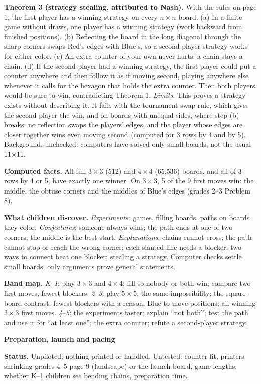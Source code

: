 \documentclass[11pt]{article}
\newcommand{\head}[1]{\par\textbf{\large #1}\par\nopagebreak}
\newcommand{\x}{\ensuremath{\times}}
\begin{document}
\textbf{Theorem 3 (strategy stealing, attributed to Nash).} With the rules on page 1, the first player has a winning strategy on every $n\x n$ board. (a) In a finite game without draws, one player has a winning strategy (work backward from finished positions). (b) Reflecting the board in the long diagonal through the sharp corners swaps Red's edges with Blue's, so a second-player strategy works for either color. (c) An extra counter of your own never hurts: a chain stays a chain. (d) If the second player had a winning strategy, the first player could put a counter anywhere and then follow it as if moving second, playing anywhere else whenever it calls for the hexagon that holds the extra counter. Then both players would be sure to win, contradicting Theorem 1. \emph{Limits.} This proves a strategy exists without describing it. It fails with the tournament swap rule, which gives the second player the win, and on boards with unequal sides, where step (b) breaks: no reflection swaps the players' edges, and the player whose edges are closer together wins even moving second (computed for 3 rows by 4 and by 5). Background, unchecked: computers have solved only small boards, not the usual 11\x11.

\textbf{Computed facts.} All full $3\x3$ (512) and $4\x4$ (65{,}536) boards, and all of 3 rows by 4 or 5, have exactly one winner. On $3\x3$, 5 of the 9 first moves win: the middle, the obtuse corners and the middles of Blue's edges (grades 2--3 Problem 8).

\textbf{What children discover.} \emph{Experiments}: games, filling boards, paths on boards they color. \emph{Conjectures}: someone always wins; the path ends at one of two corners; the middle is the best start. \emph{Explanations}: chains cannot cross; the path cannot stop or reach the wrong corner; each slanted line needs a blocker; two ways to connect beat one blocker; stealing a strategy. Computer checks settle small boards; only arguments prove general statements.

\textbf{Band map.} \emph{K--1}: play $3\x3$ and $4\x4$; fill so nobody or both win; compare two first moves; fewest blockers. \emph{2--3}: play $5\x5$; the same impossibility; the square-board contrast; fewest blockers with a reason; Blue-to-move positions; all winning $3\x3$ first moves. \emph{4--5}: the experiments faster; explain ``not both''; test the path and use it for ``at least one''; the extra counter; refute a second-player strategy.

\newpage
\head{Preparation, launch and pacing}
\textbf{Status.} Unpiloted; nothing printed or handled. Untested: counter fit, printers shrinking grades 4--5 page 9 (landscape) or the launch board, game lengths, whether K--1 children see bending chains, preparation time.
\end{document}
